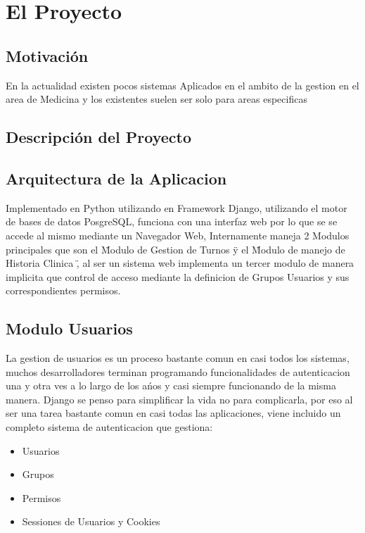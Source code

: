 \chapter{El Proyecto}

\section{Motivación}

En la actualidad existen pocos sistemas Aplicados en el ambito de la gestion en
el area de Medicina y los existentes suelen ser solo para areas especificas

\section{Descripci\'on del Proyecto}



\section{Arquitectura de la Aplicacion}

Implementado en Python utilizando en Framework Django, utilizando el motor de bases
de datos PosgreSQL, funciona con una interfaz web por lo que se se accede al
mismo mediante un Navegador Web, Internamente maneja 2 Modulos principales
que son el  \" Modulo de Gestion de Turnos \" y el \" Modulo de manejo de
Historia Clinica \" , al ser un sistema web implementa un tercer modulo de manera
implicita que control de acceso mediante la definicion de Grupos Usuarios y
sus correspondientes permisos.

\section{Modulo Usuarios}

La gestion de usuarios es un proceso bastante comun en casi todos los sistemas,
muchos desarrolladores terminan programando funcionalidades de autenticacion 
una y otra ves a lo largo de los a\'nos y casi siempre funcionando de la misma 
manera. Django se penso para simplificar la vida no para complicarla, por eso
al ser una tarea bastante comun en casi todas las aplicaciones, viene incluido
un completo sistema de autenticacion que gestiona:

\begin{itemize}
    \item Usuarios
    \item Grupos
    \item Permisos
    \item Sessiones de Usuarios y Cookies
\end{itemize}

